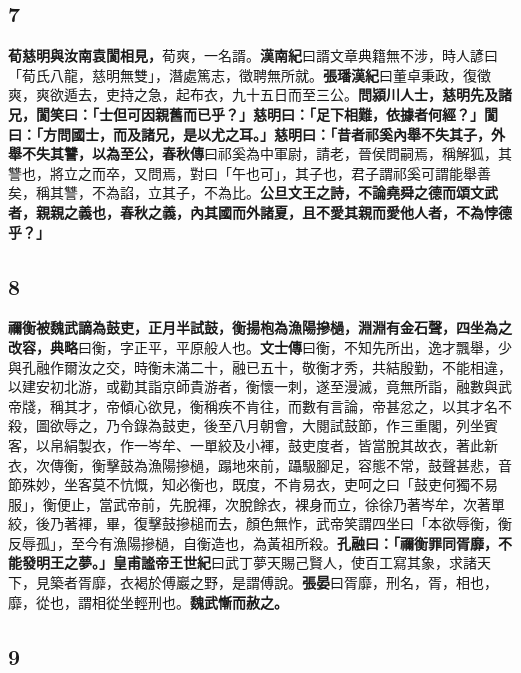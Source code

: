 \subsection*{7}

\textbf{荀慈明與汝南袁閬相見，}{\footnotesize 荀爽，一名諝。\textbf{漢南紀}曰諝文章典籍無不涉，時人諺曰「荀氏八龍，慈明無雙」，潛處篤志，徵聘無所就。\textbf{張璠漢紀}曰董卓秉政，復徵爽，爽欲遁去，吏持之急，起布衣，九十五日而至三公。}\textbf{問潁川人士，慈明先及諸兄，閬笑曰：「士但可因親舊而已乎？」慈明曰：「足下相難，依據者何經？」閬曰：「方問國士，而及諸兄，是以尤之耳。」慈明曰：「昔者祁奚內舉不失其子，外舉不失其讐，以為至公，}{\footnotesize \textbf{春秋傳}曰祁奚為中軍尉，請老，晉侯問嗣焉，稱解狐，其讐也，將立之而卒，又問焉，對曰「午也可」，其子也，君子謂祁奚可謂能舉善矣，稱其讐，不為諂，立其子，不為比。}\textbf{公旦文王之詩，不論堯舜之德而頌文武者，親親之義也，春秋之義，內其國而外諸夏，且不愛其親而愛他人者，不為悖德乎？」}

\subsection*{8}

\textbf{禰衡被魏武謫為鼓吏，正月半試鼓，衡揚枹為漁陽摻檛，淵淵有金石聲，四坐為之改容，}{\footnotesize \textbf{典略}曰衡，字正平，平原般人也。\textbf{文士傳}曰衡，不知先所出，逸才飄舉，少與孔融作爾汝之交，時衡未滿二十，融已五十，敬衡才秀，共結殷勤，不能相違，以建安初北游，或勸其詣京師貴游者，衡懷一刺，遂至漫滅，竟無所詣，融數與武帝牋，稱其才，帝傾心欲見，衡稱疾不肯往，而數有言論，帝甚忿之，以其才名不殺，圖欲辱之，乃令錄為鼓吏，後至八月朝會，大閱試鼓節，作三重閣，列坐賓客，以帛絹製衣，作一岑牟、一單絞及小褌，鼓吏度者，皆當脫其故衣，著此新衣，次傳衡，衡擊鼓為漁陽摻檛，蹋地來前，躡馺腳足，容態不常，鼓聲甚悲，音節殊妙，坐客莫不忼慨，知必衡也，既度，不肯易衣，吏呵之曰「鼓吏何獨不易服」，衡便止，當武帝前，先脫褌，次脫餘衣，裸身而立，徐徐乃著岑牟，次著單絞，後乃著褌，畢，復擊鼓摻槌而去，顏色無怍，武帝笑謂四坐曰「本欲辱衡，衡反辱孤」，至今有漁陽摻檛，自衡造也，為黃祖所殺。}\textbf{孔融曰：「禰衡罪同胥靡，不能發明王之夢。」}{\footnotesize \textbf{皇甫謐帝王世紀}曰武丁夢天賜己賢人，使百工寫其象，求諸天下，見築者胥靡，衣褐於傅巖之野，是謂傅說。\textbf{張晏}曰胥靡，刑名，胥，相也，靡，從也，謂相從坐輕刑也。}\textbf{魏武慚而赦之。}

\subsection*{9}

